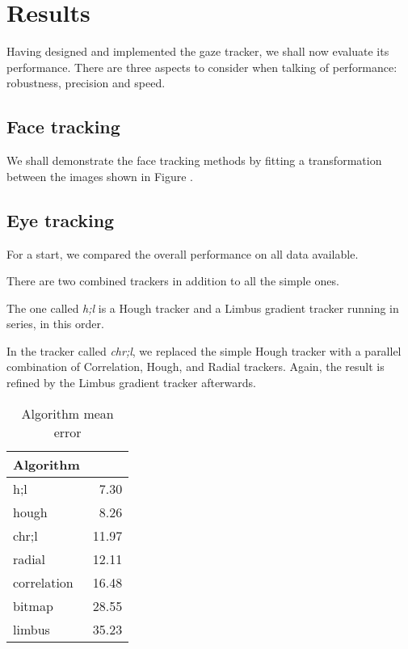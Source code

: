 \chapter{Results}
\label{s:results}
Having designed and implemented the gaze tracker, we shall now evaluate its performance.
There are three aspects to consider when talking of performance: robustness, precision and speed.

\section{Face tracking}
We shall demonstrate the face tracking methods by fitting a transformation between the images shown in Figure .


\section{Eye tracking}

For a start, we compared the overall performance on all data available.

There are two combined trackers in addition to all the simple ones.

The one called \textit{h;l} is a Hough tracker and a Limbus gradient tracker running in series, in this order.

In the tracker called \textit{chr;l}, we replaced the simple Hough tracker with a parallel combination of Correlation, Hough, and Radial trackers.
Again, the result is refined by the Limbus gradient tracker afterwards.

\begin{table}[h]
\centering
\begin{tabular}{l@{\hspace{1.5cm}}D{.}{.}{3.2}}
\toprule
\textbf{Algorithm} &  \\
\midrule
h;l & 7.30 \\
hough & 8.26 \\
chr;l & 11.97 \\
radial & 12.11 \\
correlation & 16.48 \\
bitmap & 28.55 \\
limbus & 35.23 \\
\bottomrule
\end{tabular}
\caption{Algorithm mean error}\label{t:algo-mean}
\end{table}

